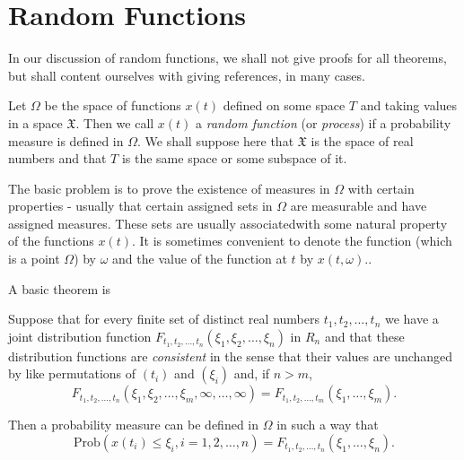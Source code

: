 \section{Random Functions}\label{chap2:sec12}

In our discussion of random functions, we shall not give proofs for
all theorems, but shall content ourselves with giving references, in
many cases.
		
Let $\Omega$ be the space of functions $x(t)$ defined on some space $T$
and taking values in a space $\mathfrak{X}$. Then we call $x(t)$ a
\textit{random function} (or \textit{process}) if a probability
measure is defined in 
$\Omega$. We shall suppose here that $\mathfrak{X}$ is the space of
real numbers and that $T$ is the same space or some subspace of it. 
		
The basic problem is to prove the existence of measures in $\Omega$ with
certain properties - usually that certain assigned sets in $\Omega$ are
measurable and have assigned measures. These sets are usually  
associated\pageoriginale with some natural property of the functions $x(t)$. It is
sometimes convenient to denote the function (which is a point $\Omega
$) by $\omega$ and the value of the function at $t$ by $x(t,\omega)..$ 

A basic theorem is
\begin{theorem}[Kolomogoroff]\label{chap2:sec12:thm44}
  Suppose that for every finite set of distinct real numbers  $t_1, t_2,
  \ldots , t_n$ we have a joint distribution function\- $ F_{t_1, t_2 ,
    \ldots, t_n} (\xi_1, \xi_2, \ldots , \xi_n)$ in $R_n$ and that these
  distribution functions are \textit{consistent} in the sense that their values
  are unchanged by like permutations of $(t_i)$ and $(\xi_i)$ and, if 
  $n>m$,
  $$ 
  F_{t_1, t_2 , \ldots, t_n} (\xi_1, \xi_2, \ldots , \xi_m, \infty ,
  \ldots, \infty) =  F_{t_1, t_2 , \ldots, t_m} (\xi_1, \ldots, \xi_m).
  $$
  
  Then a probability measure can be defined in $\Omega$ in such a way that
  \begin{equation*}
    \text{Prob} (x(t_i)\leq \xi_i, i=1, 2, \ldots, n)=  F_{t_1, t_2 , \ldots
      , t_n} (\xi_1, \ldots , \xi_n).\tag{1}\label{chap2:sec12:thm44:eq1}
  \end{equation*}
\end{theorem}

